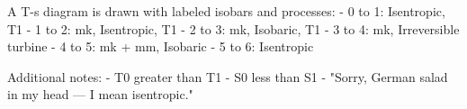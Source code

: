 A T-s diagram is drawn with labeled isobars and processes:  
- 0 to 1: Isentropic, T1  
- 1 to 2: mk, Isentropic, T1  
- 2 to 3: mk, Isobaric, T1  
- 3 to 4: mk, Irreversible turbine  
- 4 to 5: mk + mm, Isobaric  
- 5 to 6: Isentropic  

Additional notes:  
- T0 greater than T1  
- S0 less than S1  
- "Sorry, German salad in my head — I mean isentropic."